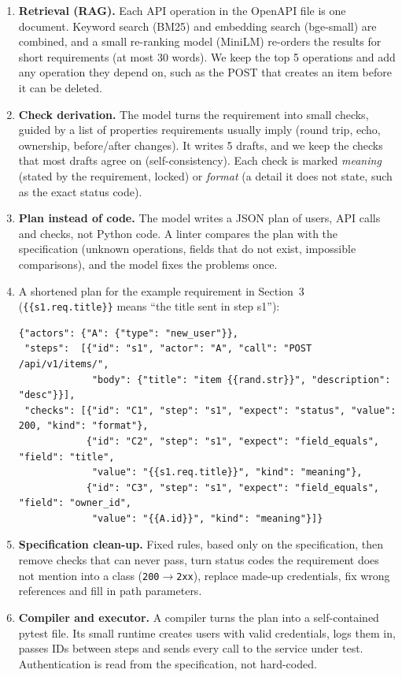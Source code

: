 \documentclass[11pt,a4paper]{article}
\begin{document}
\begin{enumerate}[label=(\arabic*)]
\item \textbf{Retrieval (RAG).} Each API operation in the OpenAPI file is one document. Keyword search (BM25) and embedding search (bge-small) are combined, and a small re-ranking model (MiniLM) re-orders the results for short requirements (at most 30 words). We keep the top 5 operations and add any operation they depend on, such as the POST that creates an item before it can be deleted.
\item \textbf{Check derivation.} The model turns the requirement into small checks, guided by a list of properties requirements usually imply (round trip, echo, ownership, before/after changes). It writes 5 drafts, and we keep the checks that most drafts agree on (self-consistency). Each check is marked \emph{meaning} (stated by the requirement, locked) or \emph{format} (a detail it does not state, such as the exact status code).
\item \textbf{Plan instead of code.} The model writes a JSON plan of users, API calls and checks, not Python code. A linter compares the plan with the specification (unknown operations, fields that do not exist, impossible comparisons), and the model fixes the problems once.
\item[] A shortened plan for the example requirement in Section~3 (\texttt{\{\{s1.req.title\}\}} means ``the title sent in step s1''):
{\footnotesize\begin{verbatim}
{"actors": {"A": {"type": "new_user"}},
 "steps":  [{"id": "s1", "actor": "A", "call": "POST /api/v1/items/",
             "body": {"title": "item {{rand.str}}", "description": "desc"}}],
 "checks": [{"id": "C1", "step": "s1", "expect": "status", "value": 200, "kind": "format"},
            {"id": "C2", "step": "s1", "expect": "field_equals", "field": "title",
             "value": "{{s1.req.title}}", "kind": "meaning"},
            {"id": "C3", "step": "s1", "expect": "field_equals", "field": "owner_id",
             "value": "{{A.id}}", "kind": "meaning"}]}
\end{verbatim}}
\vspace{-0.6em}
\item \textbf{Specification clean-up.} Fixed rules, based only on the specification, then remove checks that can never pass, turn status codes the requirement does not mention into a class (\texttt{200}$\to$\texttt{2xx}), replace made-up credentials, fix wrong references and fill in path parameters.
\item \textbf{Compiler and executor.} A compiler turns the plan into a self-contained pytest file. Its small runtime creates users with valid credentials, logs them in, passes IDs between steps and sends every call to the service under test. Authentication is read from the specification, not hard-coded.

\end{enumerate}
\end{document}
